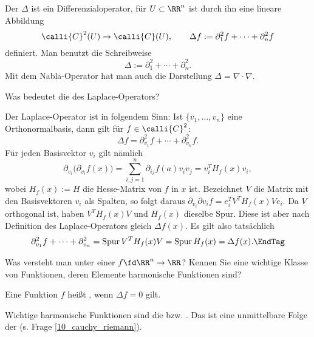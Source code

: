 \begin{antwort}
  Der  $\Delta$ ist ein 
  Differenzialoperator, für $U\subset\RR^n$ ist durch 
  ihn eine lineare Abbildung 
  \[
  \calli{C}^2(U) \to \calli{C}(U), \qquad
  \Delta f := \partial_1^2 f + \cdots + \partial_n^2 f
  \] 
  definiert. Man benutzt die Schreibweise
  \[
  \boxed{\Delta := \partial_1^2 + \cdots + \partial_n^2.} 
  \]
  Mit dem Nabla-Operator hat man auch die Darstellung 
  $\Delta = \nabla \cdot \nabla.$ \AntEnd
\end{antwort} 

\begin{frage}
  Was bedeutet die  des Laplace-Operators?
\end{frage}

\begin{antwort}
  Der Laplace-Operator ist  
  in folgendem Sinn: Ist $\{ v_1,\ldots,v_n \}$ eine 
  Orthonormalbasis, dann gilt für $f\in\calli{C}^2$: 
  \[
  \Delta f = \partial_{v_1}^2 f + \cdots + \partial_{v_n}^2 f. 
  \]
  Für jeden Basisvektor $v_i$ gilt nämlich
  \[
  \partial_{v_i} \big(\partial_{v_i} f(x)\big) = 
  \sum_{i,j=1}^n \partial_{ij} f(a) v_i v_j = v_i^T H_f(x) v_i, 
  \]
  wobei $H_f(x):=H$ die Hesse-Matrix von $f$ in $x$ ist. 
  Bezeichnet $V$ die Matrix mit den Basisvektoren $v_i$ als Spalten, so  
  folgt daraus $\partial_{v_i}\partial{v_i} f = e_i^T V^T H_f(x) V e_i$. 
  Da $V$ orthogonal ist, haben $V^T H_f(x) V$ und $H_f(x)$ dieselbe Spur. 
  Diese ist aber nach Definition des 
  Laplace-Operators gleich $\Delta f(x)$. Es gilt 
  also tatsächlich 
  \[
  \partial_{v_1}^2 f + \cdots + \partial_{v_n}^2 = 
  \mathrm{Spur}\, V^T H_f(x) V = \mathrm{Spur}\,H_f(x)=\Delta f(x).
  \EndTag
  \]
\end{antwort} 

\begin{frage}
  Was versteht man unter einer  
  $f\fd \RR^n\to\RR$? Kennen Sie eine wichtige Klasse 
  von Funktionen, deren Elemente harmonische Funktionen sind?
\end{frage}

\begin{antwort}
  Eine Funktion $f$ heißt , wenn 
  $\Delta f=0$ gilt. 

  Wichtige harmonische Funktionen sind die 
   bzw. .  
  Das ist eine unmittelbare Folge der 
  (s. Frage \ref{10_cauchy_riemann}).    
  \AntEnd 
\end{antwort} 

